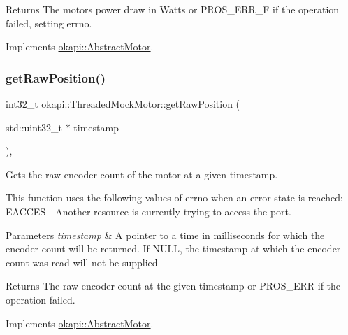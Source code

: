 \begin{DoxyReturn}{Returns}
The motor\textquotesingle{}s power draw in Watts or P\+R\+O\+S\+\_\+\+E\+R\+R\+\_\+F if the operation failed, setting errno. 
\end{DoxyReturn}


Implements \mbox{\hyperlink{classokapi_1_1AbstractMotor_aed423ac40cec85c5880f7954b6d810fe}{okapi\+::\+Abstract\+Motor}}.

\mbox{\label{classokapi_1_1ThreadedMockMotor_ab35d721ad64921a6305689c556d15b1b}} 
\subsubsection{\texorpdfstring{getRawPosition()}{getRawPosition()}}
{\footnotesize\ttfamily int32\+\_\+t okapi\+::\+Threaded\+Mock\+Motor\+::get\+Raw\+Position (\begin{DoxyParamCaption}\item[{std\+::uint32\+\_\+t $\ast$}]{timestamp }\end{DoxyParamCaption})\hspace{0.3cm}{\ttfamily [override]}, {\ttfamily [virtual]}}



Gets the raw encoder count of the motor at a given timestamp. 

This function uses the following values of errno when an error state is reached\+: E\+A\+C\+C\+ES -\/ Another resource is currently trying to access the port.


\begin{DoxyParams}{Parameters}
{\em timestamp} & A pointer to a time in milliseconds for which the encoder count will be returned. If N\+U\+LL, the timestamp at which the encoder count was read will not be supplied\\
\hline
\end{DoxyParams}
\begin{DoxyReturn}{Returns}
The raw encoder count at the given timestamp or P\+R\+O\+S\+\_\+\+E\+RR if the operation failed. 
\end{DoxyReturn}


Implements \mbox{\hyperlink{classokapi_1_1AbstractMotor_aa34fefa954fbff26e3d68e59c4f10964}{okapi\+::\+Abstract\+Motor}}.

